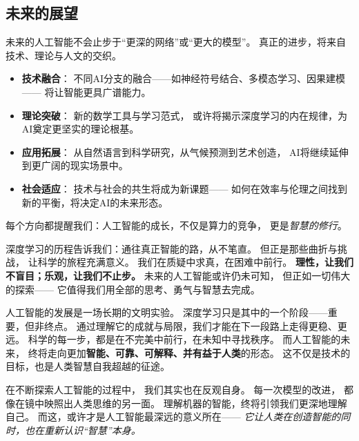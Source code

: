 \subsection{未来的展望}  
未来的人工智能不会止步于“更深的网络”或“更大的模型”。  
真正的进步，将来自技术、理论与人文的交织。  
\begin{itemize}
\item \textbf{技术融合}：  
  不同AI分支的融合——如神经符号结合、多模态学习、因果建模——  
  将让智能更具广谱能力。  
\item \textbf{理论突破}：  
  新的数学工具与学习范式，  
  或许将揭示深度学习的内在规律，为AI奠定更坚实的理论根基。  
\item \textbf{应用拓展}：  
  从自然语言到科学研究，从气候预测到艺术创造，  
  AI将继续延伸到更广阔的现实场景中。  
\item \textbf{社会适应}：  
  技术与社会的共生将成为新课题——  
  如何在效率与伦理之间找到新的平衡，将决定AI的未来形态。  
\end{itemize}
每个方向都提醒我们：人工智能的成长，不仅是算力的竞争，  
更是\textit{智慧的修行}。

深度学习的历程告诉我们：通往真正智能的路，从不笔直。  
但正是那些曲折与挑战，  
让科学的旅程充满意义。  
我们在质疑中求真，在困难中前行。  
\textbf{理性，让我们不盲目；乐观，让我们不止步。}  
未来的人工智能或许仍未可知，  
但正如一切伟大的探索——  
它值得我们用全部的思考、勇气与智慧去完成。

人工智能的发展是一场长期的文明实验。  
深度学习只是其中的一个阶段——重要，但非终点。  
通过理解它的成就与局限，我们才能在下一段路上走得更稳、更远。  
科学的每一步，都是在不完美中前行，在未知中寻找秩序。  
而人工智能的未来，  
终将走向更加\textbf{智能、可靠、可解释、并有益于人类}的形态。  
这不仅是技术的目标，也是人类智慧自我超越的征途。

在不断探索人工智能的过程中，  
我们其实也在反观自身。  
每一次模型的改进，  
都像在镜中映照出人类思维的另一面。  
理解机器的智能，终将引领我们更深地理解自己。  
而这，或许才是人工智能最深远的意义所在——  
\textit{它让人类在创造智能的同时，也在重新认识“智慧”本身。}


